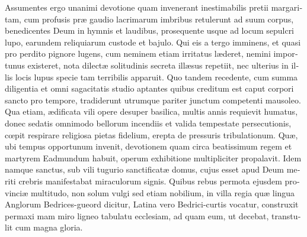 \documentclass[10pt]{book}
\begin{document}
\begin{paracol}{2}
\begin{otherlanguage}{latin}
Assumentes ergo unanimi devotione quam invenerant inestimabilis pretii margaritam, cum profusis pr\ae{} gaudio lacrimarum imbribus retulerunt ad suum corpus, benedicentes Deum in hymnis et laudibus, prosequente usque ad locum sepulcri lupo, earundem reliquiarum custode et bajulo. Qui eis a tergo imminens, et quasi pro perdito pignore lugens, cum neminem etiam irritatus l\ae{}deret, nemini importunus existeret, nota dilect\ae{} solitudinis secreta ill\ae{}sus repetiit, nec ulterius in illis locis lupus specie tam terribilis apparuit. Quo tandem recedente, cum summa diligentia et omni sagacitatis studio aptantes quibus creditum est caput corpori sancto pro tempore, tradiderunt utrumque pariter junctum competenti mausoleo. Qua etiam, \ae{}dificata vili opere desuper basilica, multis annis requievit humatus, donec sedatis omnimodo bellorum incendiis et valida tempestate persecutionis, c\oe{}pit respirare religiosa pietas fidelium, erepta de pressuris tribulationum. Qu\ae{}, ubi tempus opportunum invenit, devotionem quam circa beatissimum regem et martyrem Eadmundum habuit, operum exhibitione multipliciter propalavit. Idem namque sanctus, sub vili tugurio sanctificat\ae{} domus, cujus esset apud Deum meriti crebris manifestabat miraculorum signis. Quibus rebus permota ejusdem provinci\ae{} multitudo, non solum vulgi sed etiam nobilium, in villa regia qu\ae{} lingua Anglorum Bedrices-gueord dicitur, Latina vero Bedrici-curtis vocatur, construxit permaxi mam miro ligneo tabulatu ecclesiam, ad quam eum, ut decebat, transtulit cum magna gloria.
\end{otherlanguage}

\switchcolumn


\end{paracol}
\end{document}
